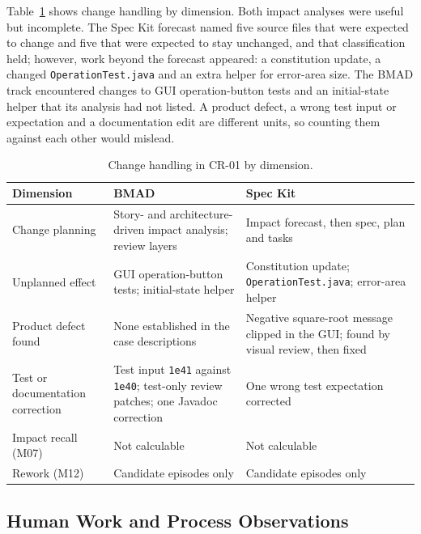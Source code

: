 \documentclass[conference]{IEEEtran}
\begin{document}
Table~\ref{tbl-change} shows change handling by dimension. Both
impact analyses were useful but incomplete. The Spec Kit forecast named
five source files that were expected to change and five that were
expected to stay unchanged, and that classification held; however, work
beyond the forecast appeared: a constitution update, a changed
\texttt{OperationTest.java} and an extra helper for error-area size. The
BMAD track encountered changes to GUI operation-button tests and an
initial-state helper that its analysis had not listed. A product defect,
a wrong test input or expectation and a documentation edit are different
units, so counting them against each other would mislead.

\begin{table}[htbp]
\caption{Change handling in CR-01 by dimension.}\label{tbl-change}
\centering\footnotesize\setlength{\tabcolsep}{3pt}
\begin{tabular}{>{\raggedright\arraybackslash}p{} >{\raggedright\arraybackslash}p{} >{\raggedright\arraybackslash}p{}}
\hline
\textbf{Dimension} & \textbf{BMAD} & \textbf{Spec Kit} \\
\hline
Change planning & Story- and architecture-driven impact analysis; review layers & Impact forecast, then spec, plan and tasks \\
Unplanned effect & GUI operation-button tests; initial-state helper & Constitution update; \texttt{OperationTest.java}; error-area helper \\
Product defect found & None established in the case descriptions & Negative square-root message clipped in the GUI; found by visual review, then fixed \\
Test or documentation correction & Test input \texttt{1e41} against \texttt{1e40}; test-only review patches; one Javadoc correction & One wrong test expectation corrected \\
Impact recall (M07) & Not calculable & Not calculable \\
Rework (M12) & Candidate episodes only & Candidate episodes only \\
\hline
\end{tabular}
\end{table}

\subsection{Human Work and Process
Observations}\label{human-work-and-process-observations}
\end{document}
